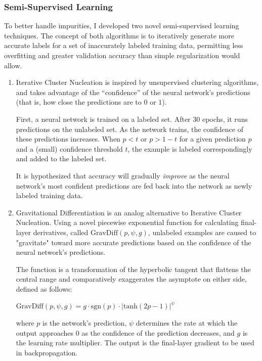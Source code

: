 \documentclass[12pt]{article}
\begin{document}
\subsubsection{Semi-Supervised Learning}

To better handle impurities, I developed two novel semi-supervised learning techniques. The concept of both algorithms is to iteratively generate more accurate labels for a set of inaccurately labeled training data, permitting less overfitting and greater validation accuracy than simple regularization would allow.

\begin{enumerate}
    \item Iterative Cluster Nucleation is inspired by unsupervised clustering algorithms, and takes advantage of the ``confidence'' of the neural network's predictions (that is, how close the predictions are to 0 or 1).
    
    First, a neural network is trained on a labeled set. After 30 epochs, it runs predictions on the unlabeled set. As the network trains, the confidence of these predictions increases. When $p < t$ or $p > 1 - t$ for a given prediction $p$ and a (small) confidence threshold $t$, the example is labeled correspondingly and added to the labeled set.

    It is hypothesized that accuracy will gradually \textit{improve} as the neural network's most confident predictions are fed back into the network as newly labeled training data.

    \item Gravitational Differentiation is an analog alternative to Iterative Cluster Nucleation. Using a novel piecewise exponential function for calculating final-layer derivatives, called $\mathrm{GravDiff}(p, \psi, g)$, unlabeled examples are caused to "gravitate" toward more accurate predictions based on the confidence of the neural network's predictions.

    The function is a transformation of the hyperbolic tangent that flattens the central range and comparatively exaggerates the asymptote on either side, defined as follows:
    \begin{center}
        $\mathrm{GravDiff}(p, \psi, g) = g \cdot \mathrm{sgn}(p) \cdot \lvert \mathrm{tanh}(2p - 1) \rvert ^ \psi$
    \end{center}
    where $p$ is the network's prediction, $\psi$ determines the rate at which the output approaches 0 as the confidence of the prediction decreases, and $g$ is the learning rate multiplier. The output is the final-layer gradient to be used in backpropagation.
\end{enumerate}
\end{document}
